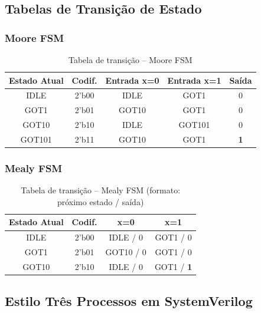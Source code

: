\documentclass[12pt,a4paper]{article}
\begin{document}
\subsection{Tabelas de Transição de Estado}

\subsubsection{Moore FSM}

\begin{table}[H]
  \centering
  \caption{Tabela de transição -- Moore FSM}
  \label{tab:trans_moore}
  \begin{tabular}{ccccc}
    \toprule
    \textbf{Estado Atual} & \textbf{Codif.} & \textbf{Entrada x=0} & \textbf{Entrada x=1} & \textbf{Saída} \\
    \midrule
    IDLE   & 2'b00 & IDLE   & GOT1   & 0 \\
    GOT1   & 2'b01 & GOT10  & GOT1   & 0 \\
    GOT10  & 2'b10 & IDLE   & GOT101 & 0 \\
    GOT101 & 2'b11 & GOT10  & GOT1   & \textbf{1} \\
    \bottomrule
  \end{tabular}
\end{table}

\subsubsection{Mealy FSM}

\begin{table}[H]
  \centering
  \caption{Tabela de transição -- Mealy FSM (formato: próximo estado / saída)}
  \label{tab:trans_mealy}
  \begin{tabular}{cccc}
    \toprule
    \textbf{Estado Atual} & \textbf{Codif.} & \textbf{x=0} & \textbf{x=1} \\
    \midrule
    IDLE  & 2'b00 & IDLE  / 0  & GOT1  / 0 \\
    GOT1  & 2'b01 & GOT10 / 0  & GOT1  / 0 \\
    GOT10 & 2'b10 & IDLE  / 0  & GOT1  / \textbf{1} \\
    \bottomrule
  \end{tabular}
\end{table}

\subsection{Estilo Três Processos em SystemVerilog}
\end{document}
